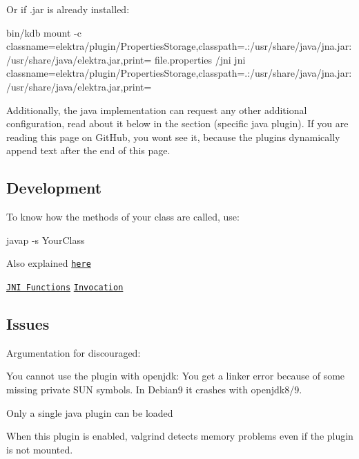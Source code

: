 Or if {\ttfamily .jar} is already installed\+: \begin{DoxyVerb}bin/kdb mount -c classname=elektra/plugin/PropertiesStorage,classpath=.:/usr/share/java/jna.jar:/usr/share/java/elektra.jar,print= file.properties /jni jni classname=elektra/plugin/PropertiesStorage,classpath=.:/usr/share/java/jna.jar:/usr/share/java/elektra.jar,print=
\end{DoxyVerb}


Additionally, the java implementation can request any other additional configuration, read about it below in the section (specific java plugin). If you are reading this page on Git\+Hub, you won\textquotesingle{}t see it, because the plugins dynamically append text after the end of this page.

\subsection*{Development}

To know how the methods of your class are called, use\+: \begin{DoxyVerb}javap -s YourClass
\end{DoxyVerb}


Also explained \href{https://docs.oracle.com/javase/7/docs/technotes/guides/jni/spec/types.html#wp15773}{\tt here}

\href{https://docs.oracle.com/javase/7/docs/technotes/guides/jni/spec/functions.html}{\tt J\+NI Functions} \href{https://docs.oracle.com/javase/7/docs/technotes/guides/jni/spec/invocation.html}{\tt Invocation}

\subsection*{Issues}

Argumentation for discouraged\+:


\begin{DoxyItemize}
\item You cannot use the plugin with openjdk\+: You get a linker error because of some missing private S\+UN symbols. In Debian9 it crashes with openjdk8/9.
\item Only a single java plugin can be loaded
\item When this plugin is enabled, valgrind detects memory problems even if the plugin is not mounted. 
\end{DoxyItemize}